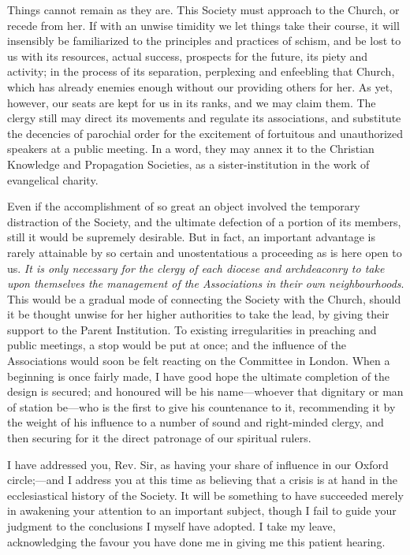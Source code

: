Things cannot remain as they are. This Society
must approach to the Church, or recede from her. If with an unwise
timidity we let things take their course, it will insensibly be
familiarized to the principles and practices of schism, and be lost to
us with its resources, actual success, prospects for the future, its
piety and activity; in the process of its separation, perplexing and
enfeebling that Church, which has already enemies enough without our
providing others for her. As yet, however, our seats are kept for us
in its ranks, and we may claim them. The clergy still may direct its
movements and regulate its associations, and substitute the decencies
of parochial order for the excitement of fortuitous and unauthorized
speakers at a public meeting. In a word, they may annex it to the
Christian Knowledge and Propagation Societies, as a sister-institution
in the work of evangelical charity.

Even if the accomplishment of so great an object
involved the temporary distraction of the Society, and the ultimate
defection of a portion of its members, still it would be supremely
desirable. But in fact, an important advantage is rarely attainable by
so certain and unostentatious a proceeding as is here open to us. \emph{It
is only necessary for the clergy of each diocese and archdeaconry to
take upon themselves the management of the Associations in their own
neighbourhoods}. This would be a gradual mode of connecting the
Society with the Church, should it be thought unwise for her higher
authorities to take the lead, by giving their support to the Parent
Institution. To existing irregularities in preaching and public
meetings, a stop would be put at once; and the influence of the
Associations would soon be felt reacting on the Committee in London.
When a beginning is once fairly made, I have good hope the
ultimate completion of the design is secured; and honoured will be his
name—whoever that dignitary or man of station be—who is the first
to give his countenance to it, recommending it by the weight of his
influence to a number of sound and right-minded clergy, and then
securing for it the direct patronage of our spiritual rulers.

I have addressed you, Rev. Sir, as having your
share of influence in our Oxford circle;—and I address you at this
time as believing that a crisis is at hand in the ecclesiastical
history of the Society. It will be something to have succeeded merely
in awakening your attention to an important subject, though I fail to
guide your judgment to the conclusions I myself have adopted. I take
my leave, acknowledging the favour you have done me in giving me this
patient hearing.


